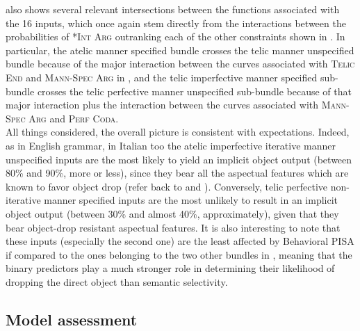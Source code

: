 also shows several relevant intersections between the functions associated with the 16 inputs, which once again stem directly from the interactions between the probabilities of \textsc{*Int Arg} outranking each of the other constraints shown in . In particular, the atelic manner specified bundle crosses the telic manner unspecified bundle because of the major interaction between the curves associated with \textsc{Telic End} and \textsc{Mann-Spec Arg} in , and the telic imperfective manner specified sub-bundle crosses the telic perfective manner unspecified sub-bundle because of that major interaction plus the interaction between the curves associated with \textsc{Mann-Spec Arg} and \textsc{Perf Coda}.\\
All things considered, the overall picture is consistent with expectations. Indeed, as in English grammar, in Italian too the atelic imperfective iterative manner unspecified inputs are the most likely to yield an implicit object output (between 80\% and 90\%, more or less), since they bear all the aspectual features which are known to favor object drop (refer back to  and ). Conversely, telic perfective non-iterative manner specified inputs are the most unlikely to result in an implicit object output (between 30\% and almost 40\%, approximately), given that they bear object-drop resistant aspectual features. It is also interesting to note that these inputs (especially the second one) are the least affected by Behavioral PISA if compared to the ones belonging to the two other bundles in , meaning that the binary predictors play a much stronger role in determining their likelihood of dropping the direct object than semantic selectivity.


\subsection{Model assessment} 

